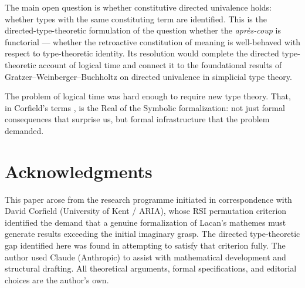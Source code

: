 \documentclass[12pt]{article}
\theoremstyle{definition}
\theoremstyle{remark}
\newcommand{\aprescoup}{\textit{apr\`{e}s-coup}}
\begin{document}
The main open question is whether constitutive directed univalence holds: whether types with the same constituting term are identified. This is the directed-type-theoretic formulation of the question whether the \aprescoup{} is functorial --- whether the retroactive constitution of meaning is well-behaved with respect to type-theoretic identity. Its resolution would complete the directed type-theoretic account of logical time and connect it to the foundational results of Gratzer--Weinberger--Buchholtz on directed univalence in simplicial type theory.

The problem of logical time was hard enough to require new type theory. That, in Corfield's terms \cite{corfield2002}, is the Real of the Symbolic formalization: not just formal consequences that surprise us, but formal infrastructure that the problem demanded.

\section*{Acknowledgments}

This paper arose from the research programme initiated in correspondence with David Corfield (University of Kent / ARIA), whose RSI permutation criterion identified the demand that a genuine formalization of Lacan's mathemes must generate results exceeding the initial imaginary grasp. The directed type-theoretic gap identified here was found in attempting to satisfy that criterion fully. The author used Claude (Anthropic) to assist with mathematical development and structural drafting. All theoretical arguments, formal specifications, and editorial choices are the author's own.
\end{document}
